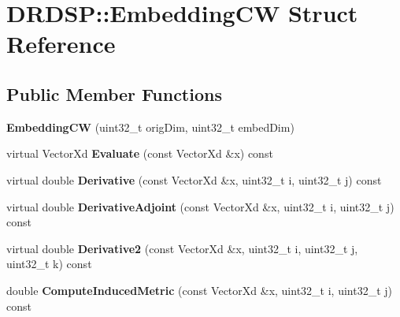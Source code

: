 \hypertarget{struct_d_r_d_s_p_1_1_embedding_c_w}{\section{D\-R\-D\-S\-P\-:\-:Embedding\-C\-W Struct Reference}
\label{struct_d_r_d_s_p_1_1_embedding_c_w}
}
\subsection*{Public Member Functions}
\begin{DoxyCompactItemize}
\item 
\hypertarget{struct_d_r_d_s_p_1_1_embedding_c_w_a36beb21857003df4f283dd1f0459b178}{{\bfseries Embedding\-C\-W} (uint32\-\_\-t orig\-Dim, uint32\-\_\-t embed\-Dim)}\label{struct_d_r_d_s_p_1_1_embedding_c_w_a36beb21857003df4f283dd1f0459b178}

\item 
\hypertarget{struct_d_r_d_s_p_1_1_embedding_c_w_a630cb32ea4cf52cc278c89322a944257}{virtual Vector\-Xd {\bfseries Evaluate} (const Vector\-Xd \&x) const }\label{struct_d_r_d_s_p_1_1_embedding_c_w_a630cb32ea4cf52cc278c89322a944257}

\item 
\hypertarget{struct_d_r_d_s_p_1_1_embedding_c_w_ae7e3c46b785e7b023119238a0d8cc0db}{virtual double {\bfseries Derivative} (const Vector\-Xd \&x, uint32\-\_\-t i, uint32\-\_\-t j) const }\label{struct_d_r_d_s_p_1_1_embedding_c_w_ae7e3c46b785e7b023119238a0d8cc0db}

\item 
\hypertarget{struct_d_r_d_s_p_1_1_embedding_c_w_a0350d8d148c7816ae8b2ee27bf4f54cd}{virtual double {\bfseries Derivative\-Adjoint} (const Vector\-Xd \&x, uint32\-\_\-t i, uint32\-\_\-t j) const }\label{struct_d_r_d_s_p_1_1_embedding_c_w_a0350d8d148c7816ae8b2ee27bf4f54cd}

\item 
\hypertarget{struct_d_r_d_s_p_1_1_embedding_c_w_a98b06fcd2b37246b967ff2660be15568}{virtual double {\bfseries Derivative2} (const Vector\-Xd \&x, uint32\-\_\-t i, uint32\-\_\-t j, uint32\-\_\-t k) const }\label{struct_d_r_d_s_p_1_1_embedding_c_w_a98b06fcd2b37246b967ff2660be15568}

\item 
\hypertarget{struct_d_r_d_s_p_1_1_embedding_c_w_a7fc6f574011396ef14a775e02fb7ef25}{double {\bfseries Compute\-Induced\-Metric} (const Vector\-Xd \&x, uint32\-\_\-t i, uint32\-\_\-t j) const }\label{struct_d_r_d_s_p_1_1_embedding_c_w_a7fc6f574011396ef14a775e02fb7ef25}


\end{DoxyCompactItemize}
